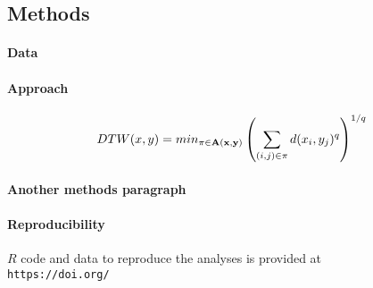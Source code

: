 \documentclass[12pt]{article}
\begin{document}
\paragraph*{}






\paragraph*{}




\paragraph*{}













\subsection*{Methods}

\paragraph*{Data}




\paragraph*{Approach}


\begin{equation}
DTW(x,y) = min_{\pi \in \bf{A(x,y)}} \left( \sum_{(i,j)\in \pi } d(x_{i}, y_{j})^{q}\right)^{1/q}
\label{eq:dtw}
\end{equation}











\paragraph*{Another methods paragraph}





\paragraph*{Reproducibility}
$R$ code and data to reproduce the analyses is provided at \\
\texttt{https://doi.org/}
\end{document}
